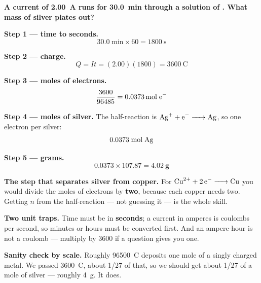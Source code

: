 \documentclass{apchem-worksheet}
\begin{document}
\begin{workedexample}
\textbf{A current of \SI{2.00}{\ampere} runs for \SI{30.0}{\minute}
through a solution of . What mass of silver plates out?}

\textbf{Step 1 --- time to seconds.}
\[ 30.0\;\text{min} \times 60 = \SI{1800}{\second} \]

\textbf{Step 2 --- charge.}
\[ Q = It = (2.00)(1800) = \SI{3600}{\coulomb} \]

\textbf{Step 3 --- moles of electrons.}
\[ \frac{3600}{96485} = \SI{0.0373}{\mole}\;\ce{e-} \]

\textbf{Step 4 --- moles of silver.} The half-reaction is
$\ce{Ag+ + e- -> Ag}$, so one electron per silver:
\[ 0.0373\;\text{mol}\;\ce{Ag} \]

\textbf{Step 5 --- grams.}
\[ 0.0373 \times 107.87 = \mathbf{\SI{4.02}{\gram}} \]

\textbf{The step that separates silver from copper.} For
$\ce{Cu^2+ + 2e- -> Cu}$ you would divide the moles of electrons by
\textbf{two}, because each copper needs two. Getting $n$ from the
half-reaction --- not guessing it --- is the whole skill.

\textbf{Two unit traps.} Time must be in \textbf{seconds}; a current in
amperes is coulombs per second, so minutes or hours must be converted
first. And an ampere-hour is not a coulomb --- multiply by 3600 if a
question gives you one.

\textbf{Sanity check by scale.} Roughly \SI{96500}{\coulomb} deposits
one mole of a singly charged metal. We passed \SI{3600}{\coulomb},
about 1/27 of that, so we should get about 1/27 of a mole of silver ---
roughly \SI{4}{\gram}. It does.
\end{workedexample}
\end{document}
